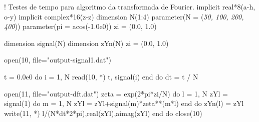 \documentclass[11pt]{article}
\author{Jefter Santiago}
\date{\today}
\title{}
\begin{document}
\tableofcontents

!     Testes de tempo para algoritmo da transformada de Fourier.
      implicit real*8(a-h, o-y)
      implicit complex*16(z-z)
      dimension N(1:4)
      parameter(N = (\emph{50, 100, 200, 400}))
      parameter(pi = acos(-1.0e0))
      zi = (0.0, 1.0)

dimension signal(N)
dimension zYn(N)
zi = (0.0, 1.0)

open(10, file="output-signal1.dat")

t = 0.0e0
do i = 1, N
   read(10, *) t, signal(i)
end do
dt = t / N

open(11, file="output-dft.dat")
zeta = exp(2*pi*zi/N)
do l = 1, N
   zYl = signal(1)
   do m = 1, N
      zYl = zYl+signal(m)*zeta**(m*l)
   end do
   zYn(l) = zYl
   write(11, *) l/(N*dt*2*pi),real(zYl),aimag(zYl)
end do
close(10)
\end{document}
